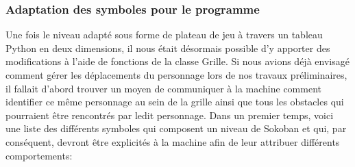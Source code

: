 \documentclass[a4paper,12pt]{article} %
\begin{document}
\subsubsection{Adaptation des symboles pour le programme}
 
Une fois le niveau adapté sous forme de plateau de jeu à travers un tableau Python en deux dimensions, il nous était désormais possible d'y apporter des modifications à l'aide de fonctions de la classe Grille. Si nous avions déjà envisagé comment gérer les déplacements du personnage lors de nos travaux préliminaires, il fallait d'abord trouver un moyen de communiquer à la machine comment identifier ce même personnage au sein de la grille ainsi que tous les obstacles qui pourraient être rencontrés par ledit personnage.
\newline
Dans un premier temps, voici une liste des différents symboles qui composent un niveau de Sokoban et qui, par conséquent, devront être explicités à la machine afin de leur attribuer différents comportements:
\end{document}
